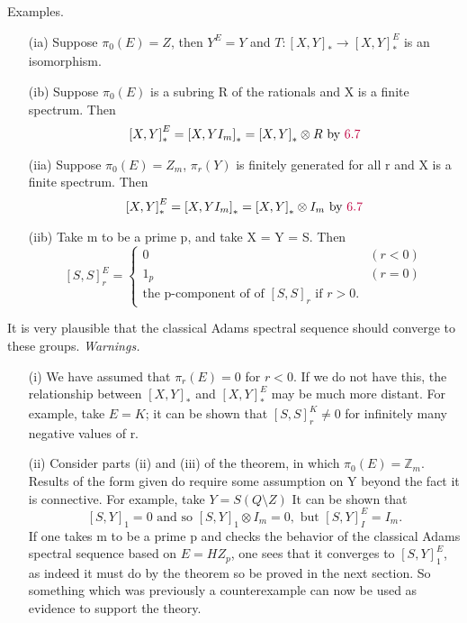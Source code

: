 \documentclass[../main]{subfiles}
\begin{document}
  
Examples. 
\begin{enumerate} 
  \item [(ia)] Suppose $\pi_{0}(E)=Z$, then $Y^E=Y$ and $T\colon \left[X,Y\right]^{}_{\ast} \to \left[X,Y\right]^{E}_{\ast}$ is an isomorphism. 
  \item [(ib)] Suppose $ \pi_{0}(E)$ is a subring R of the rationals and X is a finite spectrum. Then 
    $$
      \left[X,Y\right]^{E}_{\ast} = \left[X,YI_{m}\right]^{}_{\ast} = \left[X,Y\right]^{}_{\ast} \otimes R \text{  by {\color{purple} 6.7}}
    $$ 
  \item [(iia)] Suppose $ \pi_{0}(E)=Z_{m}$, $ \pi_{r}(Y)$ is finitely generated for all r and X is a finite spectrum. Then
    $$
      \left[X,Y\right]^{E}_{\ast} = \left[X,YI_{m}\right]^{}_{\ast} = \left[X,Y\right]^{}_{\ast} \otimes I_{m} \text{  by {\color{purple} 6.7}}
    $$ 
  \item [(iib)] Take m to be a prime p, and take X = Y = S. Then
    $$
    \left[S,S\right]^{E}_{r} = 
      \begin{cases} 
        0 & (r<0)\\
        1_{p} & (r=0)\\
        \text{the p-component of of $\left[S,S\right]^{}_{r}$ if $r>0$}.  
      \end{cases}
    $$ 
\end{enumerate}
It is very plausible that the classical Adams spectral sequence should converge to these groups.
\textit{Warnings.} 
\begin{enumerate} 
  \item [(i)] We have assumed that $\pi_{r}(E)=0$ for $r<0$. If we do not have this, the relationship between $\left[X,Y\right]_{\ast}$ and $\left[X,Y\right]^E _{\ast}$ may be much more distant. For example, take $E=K$; it can be shown that $\left[S,S\right]^K_{r} \neq 0$ for infinitely many negative values of r.

    \item [(ii)] Consider parts (ii) and (iii) of the theorem, in which $\pi_{0}(E)=\mathbb{Z}_{m}$. Results of the form given do require some assumption on Y beyond the fact it is connective. For example, take $Y = S(Q\setminus Z)$ It can be shown that 
      $$
        \left[S,Y\right]_{1} = 0 \text{  and so } \left[S,Y\right]_{1} \otimes I_{m} = 0, \text{  but } \left[S,Y\right]^E _{I} = I_{m}.
      $$ 
  If one takes m to be a prime p and checks the behavior of the classical Adams spectral sequence based on $E=HZ_{p}$, one sees that it converges to $ \left[S,Y\right]^E _{1}$, as indeed it must do by the theorem so be proved in the next section. So something which was previously a counterexample can now be used as evidence to support the theory.
\end{enumerate}
\end{document}
